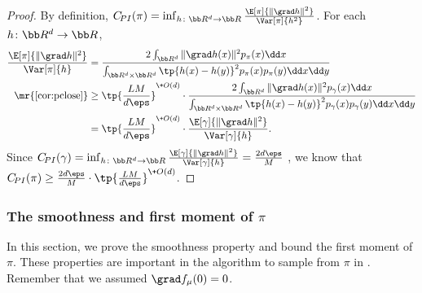 \begin{proof}
    By definition, $C_{\!{PI}}(\pi) = \inf_{h\colon\bb R^d \to \bb R} \frac{\E[\pi]{\|\grad h\|^2}}{\Var[\pi]{h^2}}$. For each $h\colon\bb R^d \to \bb R$,
    \begin{align*}
        \frac{\E[\pi]{\|\grad h\|^2}}{\Var[\pi]{h}} 
        & = \frac{2\int_{\bb R^d} \|\grad h(x)\|^2 p_\pi(x) \dd x}{\int_{\bb R^d\times \bb R^d} \tp{h(x)-h(y)}^2 p_\pi(x)p_\pi(y) \dd x \dd y} \\
        \mr{\Cref{cor:pclose}}
        &\geq \tp{\frac{LM}{d\eps}}^{\+O(d)}\cdot \frac{2\int_{\bb R^d} \|\grad h(x)\|^2 p_\gamma(x) \dd x}{\int_{\bb R^d\times \bb R^d} \tp{h(x)-h(y)}^2 p_\gamma(x)p_\gamma(y) \dd x \dd y}\\
        &= \tp{\frac{LM}{d\eps}}^{\+O(d)}\cdot \frac{\E[\gamma]{\|\grad h\|^2}}{\Var[\gamma]{h}}.
    \end{align*}
    Since $C_{\!{PI}}(\gamma) = \inf_{h\colon\bb R^d \to \bb R} \frac{\E[\gamma]{\|\grad h\|^2}}{\Var[\gamma]{h}} = \frac{2d\eps}{M}$ \cite{HE76}, we know that $C_{\!{PI}}(\pi) \geq \frac{2d\eps}{M}\cdot \tp{\frac{LM}{d\eps}}^{\+O(d)}$.

\end{proof}

\subsubsection{The smoothness and first moment of $\pi$} \label{sec:ub-smooth}

In this section, we prove the smoothness property and bound the first moment of $\pi$. These properties are important in the algorithm to sample from $\pi$ in . Remember that we assumed $\grad f_\mu(0) = 0$. 

